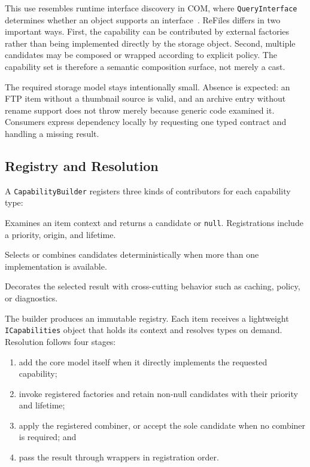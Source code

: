 \documentclass[10pt,a4paper,twoside]{article}
\begin{document}
This use resembles runtime interface discovery in COM, where \texttt{QueryInterface} determines whether an object
supports an interface~\cite{com-overview}. ReFiles differs in two important ways. First, the capability can be
contributed by external factories rather than being implemented directly by the storage object. Second, multiple
candidates may be composed or wrapped according to explicit policy. The capability set is therefore a semantic
composition surface, not merely a cast.

The required storage model stays intentionally small. Absence is expected: an FTP item without a thumbnail
source is valid, and an archive entry without rename support does not throw merely because generic code examined
it. Consumers express dependency locally by requesting one typed contract and handling a missing result.

\subsection{Registry and Resolution}

A \texttt{CapabilityBuilder} registers three kinds of contributors for each capability type:

\begin{description}[leftmargin=7.5em,style=nextline]
  \item[Factory] Examines an item context and returns a candidate or \texttt{null}. Registrations include a
        priority, origin, and lifetime.
  \item[Combiner] Selects or combines candidates deterministically when more than one implementation is
        available.
  \item[Wrapper] Decorates the selected result with cross-cutting behavior such as caching, policy, or
        diagnostics.
\end{description}

The builder produces an immutable registry. Each item receives a lightweight \texttt{ICapabilities} object that
holds its context and resolves types on demand. Resolution follows four stages:

\begin{enumerate}[leftmargin=*]
  \item add the core model itself when it directly implements the requested capability;
  \item invoke registered factories and retain non-null candidates with their priority and lifetime;
  \item apply the registered combiner, or accept the sole candidate when no combiner is required; and
  \item pass the result through wrappers in registration order.
\end{enumerate}
\end{document}

